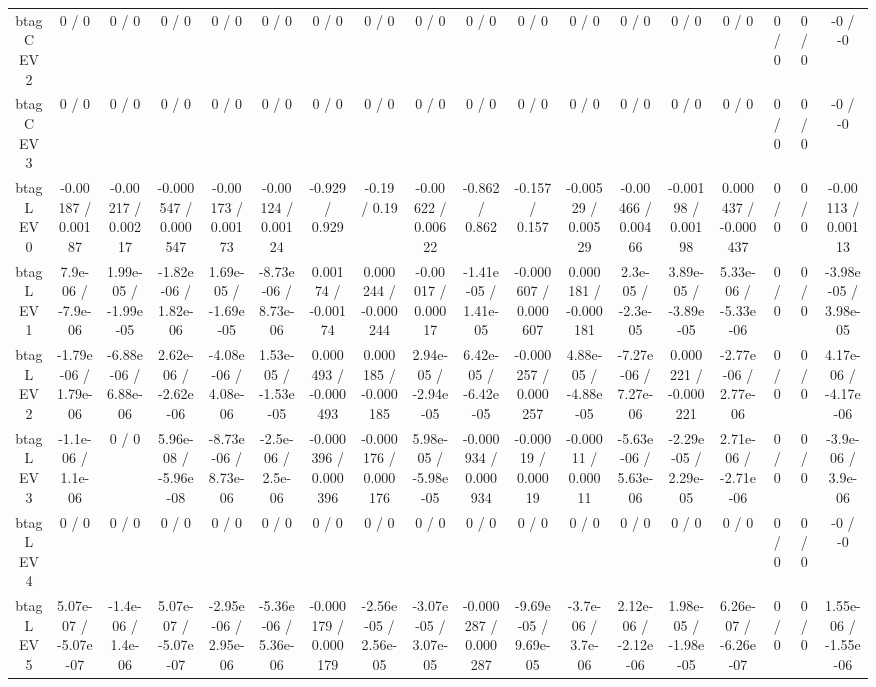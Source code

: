 \documentclass[10pt]{article}
\begin{document}
\begin{table}[htbp]
\begin{center}
\begin{tabular}{|c|c|c|c|c|c|c|c|c|c|c|c|c|c|c|c|c|c|}
  btag C EV 2 & 0 / 0 & 0 / 0 & 0 / 0 & 0 / 0 & 0 / 0 & 0 / 0 & 0 / 0 & 0 / 0 & 0 / 0 & 0 / 0 & 0 / 0 & 0 / 0 & 0 / 0 & 0 / 0 & 0 / 0 & 0 / 0 & -0 / -0 \\ 
  btag C EV 3 & 0 / 0 & 0 / 0 & 0 / 0 & 0 / 0 & 0 / 0 & 0 / 0 & 0 / 0 & 0 / 0 & 0 / 0 & 0 / 0 & 0 / 0 & 0 / 0 & 0 / 0 & 0 / 0 & 0 / 0 & 0 / 0 & -0 / -0 \\ 
  btag L EV 0 & -0.00187 / 0.00187 & -0.00217 / 0.00217 & -0.000547 / 0.000547 & -0.00173 / 0.00173 & -0.00124 / 0.00124 & -0.929 / 0.929 & -0.19 / 0.19 & -0.00622 / 0.00622 & -0.862 / 0.862 & -0.157 / 0.157 & -0.00529 / 0.00529 & -0.00466 / 0.00466 & -0.00198 / 0.00198 & 0.000437 / -0.000437 & 0 / 0 & 0 / 0 & -0.00113 / 0.00113 \\ 
  btag L EV 1 & 7.9e-06 / -7.9e-06 & 1.99e-05 / -1.99e-05 & -1.82e-06 / 1.82e-06 & 1.69e-05 / -1.69e-05 & -8.73e-06 / 8.73e-06 & 0.00174 / -0.00174 & 0.000244 / -0.000244 & -0.00017 / 0.00017 & -1.41e-05 / 1.41e-05 & -0.000607 / 0.000607 & 0.000181 / -0.000181 & 2.3e-05 / -2.3e-05 & 3.89e-05 / -3.89e-05 & 5.33e-06 / -5.33e-06 & 0 / 0 & 0 / 0 & -3.98e-05 / 3.98e-05 \\ 
  btag L EV 2 & -1.79e-06 / 1.79e-06 & -6.88e-06 / 6.88e-06 & 2.62e-06 / -2.62e-06 & -4.08e-06 / 4.08e-06 & 1.53e-05 / -1.53e-05 & 0.000493 / -0.000493 & 0.000185 / -0.000185 & 2.94e-05 / -2.94e-05 & 6.42e-05 / -6.42e-05 & -0.000257 / 0.000257 & 4.88e-05 / -4.88e-05 & -7.27e-06 / 7.27e-06 & 0.000221 / -0.000221 & -2.77e-06 / 2.77e-06 & 0 / 0 & 0 / 0 & 4.17e-06 / -4.17e-06 \\ 
  btag L EV 3 & -1.1e-06 / 1.1e-06 & 0 / 0 & 5.96e-08 / -5.96e-08 & -8.73e-06 / 8.73e-06 & -2.5e-06 / 2.5e-06 & -0.000396 / 0.000396 & -0.000176 / 0.000176 & 5.98e-05 / -5.98e-05 & -0.000934 / 0.000934 & -0.00019 / 0.00019 & -0.00011 / 0.00011 & -5.63e-06 / 5.63e-06 & -2.29e-05 / 2.29e-05 & 2.71e-06 / -2.71e-06 & 0 / 0 & 0 / 0 & -3.9e-06 / 3.9e-06 \\ 
  btag L EV 4 & 0 / 0 & 0 / 0 & 0 / 0 & 0 / 0 & 0 / 0 & 0 / 0 & 0 / 0 & 0 / 0 & 0 / 0 & 0 / 0 & 0 / 0 & 0 / 0 & 0 / 0 & 0 / 0 & 0 / 0 & 0 / 0 & -0 / -0 \\ 
  btag L EV 5 & 5.07e-07 / -5.07e-07 & -1.4e-06 / 1.4e-06 & 5.07e-07 / -5.07e-07 & -2.95e-06 / 2.95e-06 & -5.36e-06 / 5.36e-06 & -0.000179 / 0.000179 & -2.56e-05 / 2.56e-05 & -3.07e-05 / 3.07e-05 & -0.000287 / 0.000287 & -9.69e-05 / 9.69e-05 & -3.7e-06 / 3.7e-06 & 2.12e-06 / -2.12e-06 & 1.98e-05 / -1.98e-05 & 6.26e-07 / -6.26e-07 & 0 / 0 & 0 / 0 & 1.55e-06 / -1.55e-06 \\ 

\end{tabular}
\end{center}
\end{table}
\end{document}
